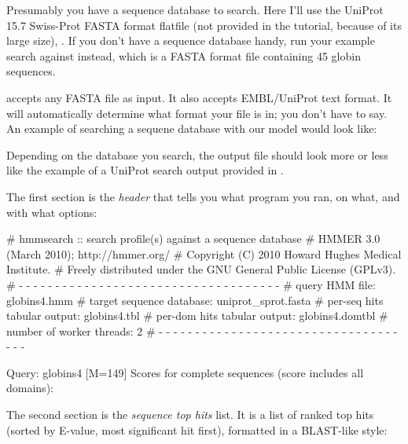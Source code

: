Presumably you have a sequence database to search. Here I'll use the
UniProt 15.7 Swiss-Prot FASTA format flatfile (not provided in the
tutorial, because of its large size), .  If
you don't have a sequence database handy, run your example search
against  instead, which is a FASTA format
file containing 45 globin sequences.

 accepts any FASTA file as input. It also accepts
EMBL/UniProt text format. It will automatically determine what format
your file is in; you don't have to say. An example of searching a
sequene database with our  model would look like:


Depending on the database you search, the output file
 should look more or less like the example of a
UniProt search output provided in .

The first section is the \emph{header} that tells you what program you
ran, on what, and with what options:

\begin{sreoutput}
# hmmsearch :: search profile(s) against a sequence database
# HMMER 3.0 (March 2010); http://hmmer.org/
# Copyright (C) 2010 Howard Hughes Medical Institute.
# Freely distributed under the GNU General Public License (GPLv3).
# - - - - - - - - - - - - - - - - - - - - - - - - - - - - - - - - - - - -
# query HMM file:                  globins4.hmm
# target sequence database:        uniprot_sprot.fasta
# per-seq hits tabular output:     globins4.tbl
# per-dom hits tabular output:     globins4.domtbl
# number of worker threads:        2
# - - - - - - - - - - - - - - - - - - - - - - - - - - - - - - - - - - - -

Query:       globins4  [M=149]
Scores for complete sequences (score includes all domains):
\end{sreoutput}

The second section is the \emph{sequence top hits} list. It is a list
of ranked top hits (sorted by E-value, most significant hit first),
formatted in a BLAST-like style:


